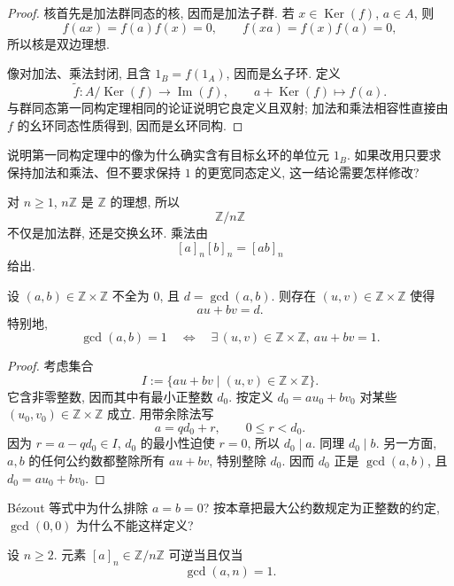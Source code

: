 \documentclass[usesamecnt, thmcnt=section, lang=cn, newtx, 10pt, scheme=chinese]{elegantbook}
\begin{document}
\begin{proof}
核首先是加法群同态的核, 因而是加法子群. 若 $x\in\operatorname{Ker}(f)$, $a\in A$, 则
\[
 f(ax)=f(a)f(x)=0,
 \qquad
 f(xa)=f(x)f(a)=0,
\]
所以核是双边理想.

像对加法、乘法封闭, 且含 $1_B=f(1_A)$, 因而是幺子环. 定义
\[
 \widetilde f:A/\operatorname{Ker}(f)\to\operatorname{Im}(f),
 \qquad
 a+\operatorname{Ker}(f)\longmapsto f(a).
\]
与群同态第一同构定理相同的论证说明它良定义且双射; 加法和乘法相容性直接由 $f$ 的幺环同态性质得到, 因而是幺环同构.
\end{proof}

\begin{exercise}\label{ex:alg-ring-first-iso-unital}
说明第一同构定理中的像为什么确实含有目标幺环的单位元 $1_B$. 如果改用只要求保持加法和乘法、但不要求保持 $1$ 的更宽同态定义, 这一结论需要怎样修改?
\end{exercise}


\begin{instance}
对 $n\geq1$, $n\mathbb Z$ 是 $\mathbb Z$ 的理想, 所以
\[
 \mathbb Z/n\mathbb Z
\]
不仅是加法群, 还是交换幺环. 乘法由
\[
 [a]_n[b]_n=[ab]_n
\]
给出.
\end{instance}

\begin{proposition}[Bézout 等式]\label{prop:alg-bezout}
设 $(a,b)\in\mathbb Z\times\mathbb Z$ 不全为 $0$, 且 $d=\gcd(a,b)$. 则存在 $(u,v)\in\mathbb Z\times\mathbb Z$ 使得
\[
 au+bv=d.
\]
特别地,
\[
 \gcd(a,b)=1
 \quad\Longleftrightarrow\quad
 \exists\,(u,v)\in\mathbb Z\times\mathbb Z,\ au+bv=1.
\]
\end{proposition}

\begin{proof}
考虑集合
\[
 I:=\{au+bv\mid (u,v)\in\mathbb Z\times\mathbb Z\}.
\]
它含非零整数, 因而其中有最小正整数 $d_0$. 按定义 $d_0=au_0+bv_0$ 对某些 $(u_0,v_0)\in\mathbb Z\times\mathbb Z$ 成立. 用带余除法写
\[
 a=qd_0+r,\qquad 0\leq r<d_0.
\]
因为 $r=a-qd_0\in I$, $d_0$ 的最小性迫使 $r=0$, 所以 $d_0\mid a$. 同理 $d_0\mid b$. 另一方面, $a,b$ 的任何公约数都整除所有 $au+bv$, 特别整除 $d_0$. 因而 $d_0$ 正是 $\gcd(a,b)$, 且 $d_0=au_0+bv_0$.
\end{proof}

\begin{exercise}\label{ex:alg-bezout-both-zero}
Bézout 等式中为什么排除 $a=b=0$? 按本章把最大公约数规定为正整数的约定, $\gcd(0,0)$ 为什么不能这样定义?
\end{exercise}

\begin{proposition}\label{prop:alg-unit-mod-n}
设 $n\geq2$. 元素 $[a]_n\in\mathbb Z/n\mathbb Z$ 可逆当且仅当
\[
 \gcd(a,n)=1.
\]
\end{proposition}
\end{document}
